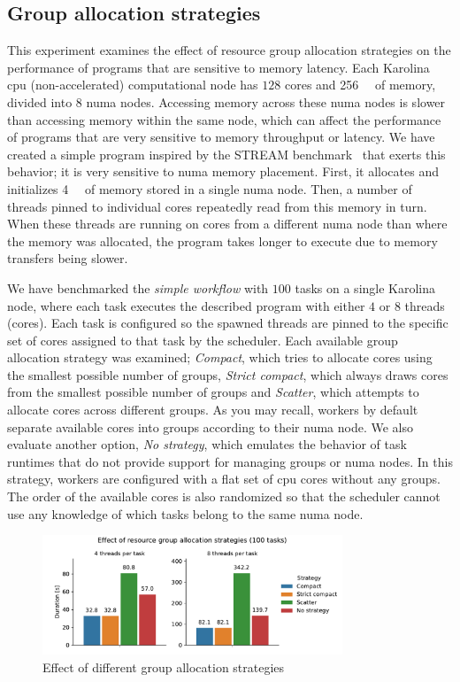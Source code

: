 \subsection{Group allocation strategies}
\label{sec:hq-exp-numa}
This experiment examines the effect of resource group allocation strategies on the
performance of programs that are sensitive to memory latency. Each Karolina
\gls{cpu} (non-accelerated)
computational node has $128$ cores and \SI{256}{\gibi\byte} of memory, divided
into $8$ \gls{numa} nodes. Accessing memory across these
\gls{numa} nodes is slower than accessing memory within the same node, which can
affect the performance of programs that are very sensitive to memory throughput or latency. We have
created a simple program inspired by the STREAM benchmark~\cite{stream} that exerts this
behavior; it is very sensitive to \gls{numa} memory placement. First, it allocates and
initializes \SI{4}{\gibi\byte} of memory stored in a single \gls{numa} node.
Then, a number of threads pinned to individual cores repeatedly read from this memory in turn. When
these threads are running on cores from a different \gls{numa} node than where the memory was
allocated, the program takes longer to execute due to memory transfers being slower.

We have benchmarked the \emph{simple workflow} with $100$ tasks on a single
Karolina node, where each task executes the described program with either $4$
or $8$ threads (cores). Each task is configured so the spawned threads are
pinned to the specific set of cores assigned to that task by the
scheduler. Each available group allocation strategy was
examined; \emph{Compact}, which tries to allocate cores using the smallest possible
number of groups, \emph{Strict compact}, which always draws cores from the smallest possible
number of groups and \emph{Scatter}, which attempts to allocate cores across different groups.
As you may recall,
\hyperqueue{} workers by default separate available cores into groups according to their
\gls{numa} node. We also evaluate another option, \emph{No strategy}, which
emulates the behavior of task runtimes that do not provide support for managing groups or
\gls{numa} nodes. In this strategy, workers are configured with a flat set of
\gls{cpu} cores without any groups. The order of the available cores is also
randomized so that the scheduler cannot use any knowledge of which tasks belong to the same
\gls{numa} node.

\begin{figure}[h]
	\centering
	\includegraphics[width=0.8\textwidth]{imgs/hq/charts/numa}
	\caption{Effect of different group allocation strategies}
	\label{fig:hq-numa}
\end{figure}

